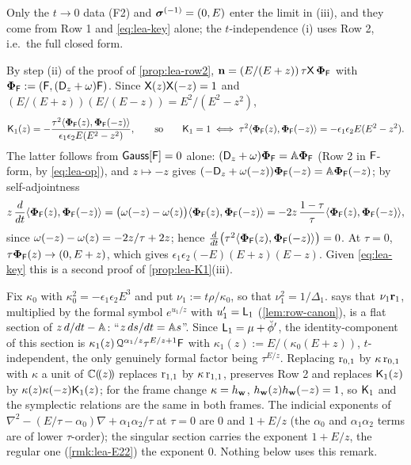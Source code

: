 Only the $t\to 0$ data (F2) and $\boldsymbol{\sigma}^{(-1)} = (0,E)$ enter the limit in (iii), and they come from Row 1 and \eqref{eq:lea-key} alone; the $t$-independence (i) uses Row 2, i.e.\ the full closed form.

\begin{rmk}[$\Kone = 1$ as a Wronskian identity for Gauss's equation]
\label{rmk:lea-wronsk}
By step (ii) of the proof of \cref{prop:lea-row2}, $\mathbf{n} = (E/(E+z))\,\tau\mathsf{X}\,\boldsymbol{\Phi}_{\mathsf{F}}$ with $\boldsymbol{\Phi}_{\mathsf{F}} := (\mathsf{F},(\mathsf{D}_{z}+\omega)\mathsf{F})$. Since $\mathsf{X}(z)\mathsf{X}(-z) = 1$ and $(E/(E+z))(E/(E-z)) = E^2/(E^2-z^2)$,
\[
\mathsf{K}_{1}(z) = -\frac{\tau^2\langle\boldsymbol{\Phi}_{\mathsf{F}}(z),\boldsymbol{\Phi}_{\mathsf{F}}(-z)\rangle}{\epsilon_1\epsilon_2E(E^2-z^2)},\qquad\text{so}\qquad \mathsf{K}_{1} = 1\iff \tau^2\langle\boldsymbol{\Phi}_{\mathsf{F}}(z),\boldsymbol{\Phi}_{\mathsf{F}}(-z)\rangle = -\epsilon_1\epsilon_2E(E^2-z^2).
\]
The latter follows from $\mathsf{Gauss}[\mathsf{F}] = 0$ alone: $(\mathsf{D}_{z}+\omega)\boldsymbol{\Phi}_{\mathsf{F}} = \mathbb{A}\boldsymbol{\Phi}_{\mathsf{F}}$ (Row 2 in $\mathsf{F}$-form, by \eqref{eq:lea-op}), and $z\mapsto -z$ gives $(-\mathsf{D}_{z}+\omega(-z))\boldsymbol{\Phi}_{\mathsf{F}}(-z) = \mathbb{A}\boldsymbol{\Phi}_{\mathsf{F}}(-z)$; by self-adjointness
\[
z\,\frac{d}{dt}\langle\boldsymbol{\Phi}_{\mathsf{F}}(z),\boldsymbol{\Phi}_{\mathsf{F}}(-z)\rangle = \bigl(\omega(-z)-\omega(z)\bigr)\langle\boldsymbol{\Phi}_{\mathsf{F}}(z),\boldsymbol{\Phi}_{\mathsf{F}}(-z)\rangle = -2z\,\frac{1-\tau}{\tau}\langle\boldsymbol{\Phi}_{\mathsf{F}}(z),\boldsymbol{\Phi}_{\mathsf{F}}(-z)\rangle,
\]
since $\omega(-z)-\omega(z) = -2z/\tau + 2z$; hence $\frac{d}{dt}\bigl(\tau^2\langle\boldsymbol{\Phi}_{\mathsf{F}}(z),\boldsymbol{\Phi}_{\mathsf{F}}(-z)\rangle\bigr) = 0$. At $\tau = 0$, $\tau\boldsymbol{\Phi}_{\mathsf{F}}(z)\to(0,E+z)$, which gives $\epsilon_1\epsilon_2(-E)(E+z)(E-z)$. Given \eqref{eq:lea-key} this is a second proof of \cref{prop:lea-K1}(iii).
\end{rmk}

\begin{rmk}
\label{rmk:lea-flat}
Fix $\kappa_0$ with $\kappa_0^2 = -\epsilon_1\epsilon_2E^3$ and put $\nu_1 := t\rho/\kappa_0$, so that $\nu_1^2 = 1/\Delta_1$.  says that $\nu_1\mathbf{r}_1$, multiplied by the formal symbol $e^{u_1/z}$ with $u_1' = \mathsf{L}_1$ (\cref{lem:row-canon}), is a flat section of $z\,d/dt - \mathbb{A}$: ``$z\,ds/dt = \mathbb{A} s$''. Since $\mathsf{L}_1 = \mu + \breve{\phi}'$, the identity-component of this section is $\kappa_1(z)\,\mathcal{Q}^{\alpha_1/z}\tau^{E/z+1}\mathsf{F}$ with $\kappa_1(z) := E/(\kappa_0(E+z))$, $t$-independent, the only genuinely formal factor being $\tau^{E/z}$. Replacing $\mathrm{r}_{0,1}$ by $\kappa\,\mathrm{r}_{0,1}$ with $\kappa$ a unit of $\mathbb{C}(\!(z)\!)$ replaces $\mathrm{r}_{1,1}$ by $\kappa\,\mathrm{r}_{1,1}$, preserves Row 2 and replaces $\mathsf{K}_{1}(z)$ by $\kappa(z)\kappa(-z)\mathsf{K}_{1}(z)$; for the frame change $\kappa = h_{\mathbf{w}}$, $h_{\mathbf{w}}(z)h_{\mathbf{w}}(-z) = 1$, so $\mathsf{K}_{1}$ and the symplectic relations are the same in both frames. The indicial exponents of $\nabla^2 - (E/\tau-\alpha_0)\nabla + \alpha_1\alpha_2/\tau$ at $\tau = 0$ are $0$ and $1 + E/z$ (the $\alpha_0$ and $\alpha_1\alpha_2$ terms are of lower $\tau$-order); the singular section carries the exponent $1 + E/z$, the regular one (\cref{rmk:lea-E22}) the exponent $0$. Nothing below uses this remark.
\end{rmk}

